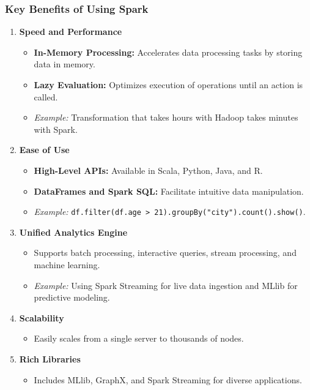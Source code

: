 \documentclass[aspectratio=169]{beamer}
\begin{document}
\begin{frame}[fragile]
    \frametitle{Key Benefits of Using Spark}
    \begin{enumerate}
        \item \textbf{Speed and Performance}
            \begin{itemize}
                \item \textbf{In-Memory Processing:} Accelerates data processing tasks by storing data in memory.
                \item \textbf{Lazy Evaluation:} Optimizes execution of operations until an action is called.
                \item \textit{Example:} Transformation that takes hours with Hadoop takes minutes with Spark.
            \end{itemize}
        \item \textbf{Ease of Use}
            \begin{itemize}
                \item \textbf{High-Level APIs:} Available in Scala, Python, Java, and R.
                \item \textbf{DataFrames and Spark SQL:} Facilitate intuitive data manipulation.
                \item \textit{Example:} \texttt{df.filter(df.age > 21).groupBy("city").count().show()}.
            \end{itemize}
        \item \textbf{Unified Analytics Engine}
            \begin{itemize}
                \item Supports batch processing, interactive queries, stream processing, and machine learning.
                \item \textit{Example:} Using Spark Streaming for live data ingestion and MLlib for predictive modeling.
            \end{itemize}
        \item \textbf{Scalability}
            \begin{itemize}
                \item Easily scales from a single server to thousands of nodes.
            \end{itemize}
        \item \textbf{Rich Libraries}
            \begin{itemize}
                \item Includes MLlib, GraphX, and Spark Streaming for diverse applications.
            \end{itemize}
    \end{enumerate}
\end{frame}
\end{document}
